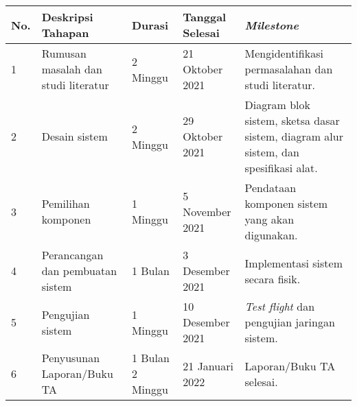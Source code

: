 \documentclass[main]{subfiles}
\begin{document}
\begin{center}
	\begin{tabular}{|p{1cm}|p{4cm}|p{2cm}|p{2cm}|p{4cm}|}
		\hline
		\textbf{No.} & \textbf{Deskripsi Tahapan} & \textbf{Durasi} & \textbf{Tanggal Selesai} & \textbf{\textit{Milestone}} \\
		\hline
		1 & Rumusan masalah dan studi literatur & 2 Minggu & 21 Oktober 2021 & Mengidentifikasi permasalahan dan studi literatur. \\
		\hline
		2 & Desain sistem & 2 Minggu & 29 Oktober 2021 & Diagram blok sistem, sketsa dasar sistem, diagram alur sistem, dan spesifikasi alat. \\
		\hline
		3 & Pemilihan komponen & 1 Minggu & 5 November 2021 & Pendataan komponen sistem yang akan digunakan. \\
		\hline
		4 & Perancangan dan pembuatan sistem & 1 Bulan & 3 Desember 2021 & Implementasi sistem secara fisik. \\
		\hline
		5 & Pengujian sistem & 1 Minggu & 10 Desember 2021 & \textit{Test flight} dan pengujian jaringan sistem. \\
		\hline
		6 & Penyusunan Laporan/Buku TA & 1 Bulan 2 Minggu & 21 Januari 2022 & Laporan/Buku TA selesai. \\
		\hline
	\end{tabular}
\end{center}
\end{document}
